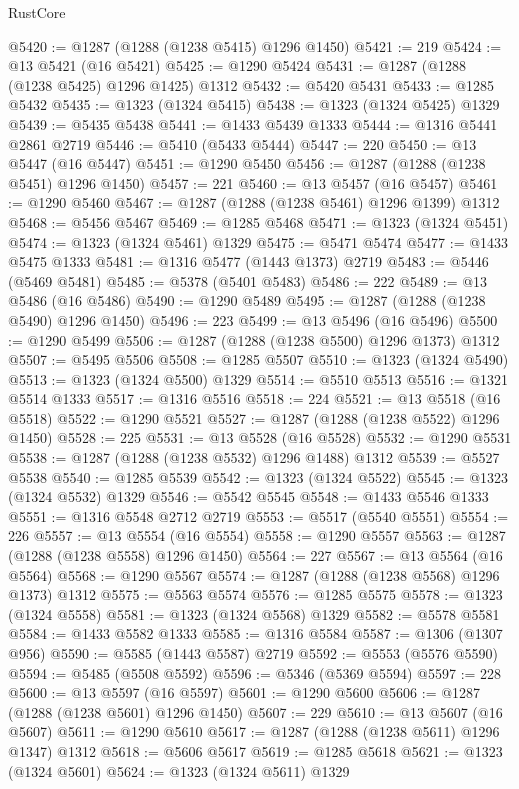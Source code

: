 \begin{lexlean}{RustCore}
\begin{coremodule}
@5420 := @1287 (@1288 (@1238 @5415) @1296 @1450)
@5421 := 219
@5424 := @13 @5421 (@16 @5421)
@5425 := @1290 @5424
@5431 := @1287 (@1288 (@1238 @5425) @1296 @1425) @1312
@5432 := @5420 @5431
@5433 := @1285 @5432
@5435 := @1323 (@1324 @5415)
@5438 := @1323 (@1324 @5425) @1329
@5439 := @5435 @5438
@5441 := @1433 @5439 @1333
@5444 := @1316 @5441 @2861 @2719
@5446 := @5410 (@5433 @5444)
@5447 := 220
@5450 := @13 @5447 (@16 @5447)
@5451 := @1290 @5450
@5456 := @1287 (@1288 (@1238 @5451) @1296 @1450)
@5457 := 221
@5460 := @13 @5457 (@16 @5457)
@5461 := @1290 @5460
@5467 := @1287 (@1288 (@1238 @5461) @1296 @1399) @1312
@5468 := @5456 @5467
@5469 := @1285 @5468
@5471 := @1323 (@1324 @5451)
@5474 := @1323 (@1324 @5461) @1329
@5475 := @5471 @5474
@5477 := @1433 @5475 @1333
@5481 := @1316 @5477 (@1443 @1373) @2719
@5483 := @5446 (@5469 @5481)
@5485 := @5378 (@5401 @5483)
@5486 := 222
@5489 := @13 @5486 (@16 @5486)
@5490 := @1290 @5489
@5495 := @1287 (@1288 (@1238 @5490) @1296 @1450)
@5496 := 223
@5499 := @13 @5496 (@16 @5496)
@5500 := @1290 @5499
@5506 := @1287 (@1288 (@1238 @5500) @1296 @1373) @1312
@5507 := @5495 @5506
@5508 := @1285 @5507
@5510 := @1323 (@1324 @5490)
@5513 := @1323 (@1324 @5500) @1329
@5514 := @5510 @5513
@5516 := @1321 @5514 @1333
@5517 := @1316 @5516
@5518 := 224
@5521 := @13 @5518 (@16 @5518)
@5522 := @1290 @5521
@5527 := @1287 (@1288 (@1238 @5522) @1296 @1450)
@5528 := 225
@5531 := @13 @5528 (@16 @5528)
@5532 := @1290 @5531
@5538 := @1287 (@1288 (@1238 @5532) @1296 @1488) @1312
@5539 := @5527 @5538
@5540 := @1285 @5539
@5542 := @1323 (@1324 @5522)
@5545 := @1323 (@1324 @5532) @1329
@5546 := @5542 @5545
@5548 := @1433 @5546 @1333
@5551 := @1316 @5548 @2712 @2719
@5553 := @5517 (@5540 @5551)
@5554 := 226
@5557 := @13 @5554 (@16 @5554)
@5558 := @1290 @5557
@5563 := @1287 (@1288 (@1238 @5558) @1296 @1450)
@5564 := 227
@5567 := @13 @5564 (@16 @5564)
@5568 := @1290 @5567
@5574 := @1287 (@1288 (@1238 @5568) @1296 @1373) @1312
@5575 := @5563 @5574
@5576 := @1285 @5575
@5578 := @1323 (@1324 @5558)
@5581 := @1323 (@1324 @5568) @1329
@5582 := @5578 @5581
@5584 := @1433 @5582 @1333
@5585 := @1316 @5584
@5587 := @1306 (@1307 @956)
@5590 := @5585 (@1443 @5587) @2719
@5592 := @5553 (@5576 @5590)
@5594 := @5485 (@5508 @5592)
@5596 := @5346 (@5369 @5594)
@5597 := 228
@5600 := @13 @5597 (@16 @5597)
@5601 := @1290 @5600
@5606 := @1287 (@1288 (@1238 @5601) @1296 @1450)
@5607 := 229
@5610 := @13 @5607 (@16 @5607)
@5611 := @1290 @5610
@5617 := @1287 (@1288 (@1238 @5611) @1296 @1347) @1312
@5618 := @5606 @5617
@5619 := @1285 @5618
@5621 := @1323 (@1324 @5601)
@5624 := @1323 (@1324 @5611) @1329

\end{coremodule}
\end{lexlean}

